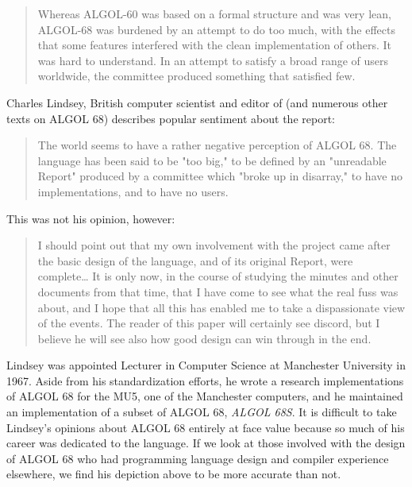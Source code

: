 \begin{quotation}
Whereas ALGOL-60 was based on a formal structure
and was very lean, ALGOL-68 was burdened by an attempt to do too
much, with the effects that some features interfered with the clean
implementation of others. It was hard to understand. In an attempt to
satisfy a broad range of users worldwide, the committee produced
something that satisfied few.
\end{quotation}

Charles Lindsey, British computer scientist and editor of
(and numerous other texts on ALGOL 68) describes popular sentiment about the
report\cite{a_history_of_algol_68_1993}:
\begin{quotation}
The world seems to have a rather negative perception of ALGOL 68. The language has been said to
be "too big," to be defined by an "unreadable Report" produced by a committee which "broke up in
disarray," to have no implementations, and to have no users. 
\end{quotation}

This was not his opinion, however\cite{a_history_of_algol_68_1993}:

\begin{quotation}
I should point out that my own involvement with the project came after the basic design of the
language, and of its original Report, were complete\dots
It is only now, in the course of studying the minutes and other
documents from that time, that I have come to see what the real fuss was about, and I hope that all
this has enabled me to take a dispassionate view of the events. The reader of this paper will certainly
see discord, but I believe he will see also how good design can win through in the end. 
\end{quotation}

Lindsey was appointed Lecturer in Computer Science at Manchester University
in 1967. Aside from his standardization efforts, he wrote a research implementations of
ALGOL 68 for the MU5, one of the Manchester computers, and he maintained an
implementation of a subset of ALGOL 68, \textit{ALGOL 68S}.
It is difficult to take Lindsey's opinions about ALGOL 68 entirely at face
value because so much of his career was dedicated to the language.
If we look at those involved with the design of ALGOL 68 who
had programming language design and compiler experience elsewhere,
we find his depiction above to be more accurate than not.

